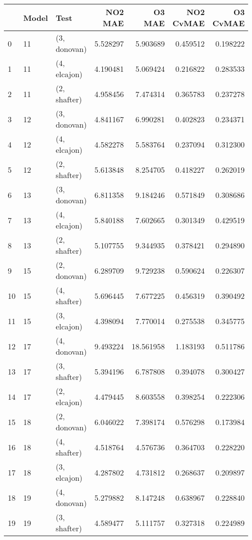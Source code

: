 \begin{tabular}{lllrrrr}
\toprule
{} & Model &          Test &    NO2 MAE &     O3 MAE &  NO2 CvMAE &  O3 CvMAE \\
\midrule
0  &    11 &  (3, donovan) &   5.528297 &   5.903689 &   0.459512 &  0.198222 \\
1  &    11 &  (4, elcajon) &   4.190481 &   5.069424 &   0.216822 &  0.283533 \\
2  &    11 &  (2, shafter) &   4.958456 &   7.474314 &   0.365783 &  0.237278 \\
3  &    12 &  (3, donovan) &   4.841167 &   6.990281 &   0.402823 &  0.234371 \\
4  &    12 &  (4, elcajon) &   4.582278 &   5.583764 &   0.237094 &  0.312300 \\
5  &    12 &  (2, shafter) &   5.613848 &   8.254705 &   0.418227 &  0.262019 \\
6  &    13 &  (3, donovan) &   6.811358 &   9.184246 &   0.571849 &  0.308686 \\
7  &    13 &  (4, elcajon) &   5.840188 &   7.602665 &   0.301349 &  0.429519 \\
8  &    13 &  (2, shafter) &   5.107755 &   9.344935 &   0.378421 &  0.294890 \\
9  &    15 &  (2, donovan) &   6.289709 &   9.729238 &   0.590624 &  0.226307 \\
10 &    15 &  (4, shafter) &   5.696445 &   7.677225 &   0.456319 &  0.390492 \\
11 &    15 &  (3, elcajon) &   4.398094 &   7.770014 &   0.275538 &  0.345775 \\
12 &    17 &  (4, donovan) &   9.493224 &  18.561958 &   1.183193 &  0.511786 \\
13 &    17 &  (3, shafter) &   5.394196 &   6.787808 &   0.394078 &  0.300427 \\
14 &    17 &  (2, elcajon) &   4.479445 &   8.603558 &   0.398254 &  0.222306 \\
15 &    18 &  (2, donovan) &   6.046022 &   7.398174 &   0.576298 &  0.173984 \\
16 &    18 &  (4, shafter) &   4.518764 &   4.576736 &   0.364703 &  0.228220 \\
17 &    18 &  (3, elcajon) &   4.287802 &   4.731812 &   0.268637 &  0.209897 \\
18 &    19 &  (4, donovan) &   5.279882 &   8.147248 &   0.638967 &  0.228840 \\
19 &    19 &  (3, shafter) &   4.589477 &   5.111757 &   0.327318 &  0.224989 \\

\end{tabular}
